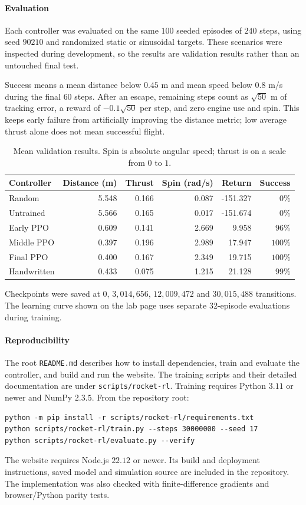 \documentclass[12pt, letterpaper]{article}
\begin{document}
\paragraph{Evaluation}
Each controller was evaluated on the same $100$ seeded episodes
of $240$ steps, using seed $90210$ and randomized static or
sinusoidal targets. These scenarios were inspected during
development, so the results are validation results rather than
an untouched final test.

Success means a mean distance below $0.45$ m and mean speed below
$0.8$ m/s during the final $60$ steps. After an escape, remaining
steps count as $\sqrt{50}$ m of tracking error, a reward of
$-0.1\sqrt{50}$ per step, and zero engine use and spin.
This keeps early failure from artificially improving the distance
metric; low average thrust alone does not mean successful flight.

\begin{table}[htbp]
\centering
\small
\setlength{\tabcolsep}{5pt}
\begin{tabular}{lrrrrr}
\hline
Controller & Distance (m) & Thrust & Spin (rad/s) & Return & Success\\
\hline
Random      & 5.548 & 0.166 & 0.087 & -151.327 & $0\%$\\
Untrained   & 5.566 & 0.165 & 0.017 & -151.674 & $0\%$\\
Early PPO   & 0.609 & 0.141 & 2.669 & 9.958    & $96\%$\\
Middle PPO  & 0.397 & 0.196 & 2.989 & 17.947   & $100\%$\\
Final PPO   & 0.400 & 0.167 & 2.349 & 19.715   & $100\%$\\
Handwritten & 0.433 & 0.075 & 1.215 & 21.128   & $99\%$\\
\hline
\end{tabular}
\caption{Mean validation results. Spin is absolute angular speed;
thrust is on a scale from $0$ to $1$.}
\end{table}

Checkpoints were saved at $0$, $3,014,656$, $12,009,472$ and
$30,015,488$ transitions. The learning curve shown on the lab page
uses separate $32$-episode evaluations during training.

\paragraph{Reproducibility}
The root \texttt{README.md} describes how to install dependencies,
train and evaluate the controller, and build and run the website.
The training scripts and their detailed documentation are under
\texttt{scripts/rocket-rl}. Training requires Python $3.11$ or newer
and NumPy $2.3.5$. From the repository root:
\begin{verbatim}
python -m pip install -r scripts/rocket-rl/requirements.txt
python scripts/rocket-rl/train.py --steps 30000000 --seed 17
python scripts/rocket-rl/evaluate.py --verify
\end{verbatim}
The website requires Node.js $22.12$ or newer. Its build and
deployment instructions, saved model and simulation source are
included in the repository. The implementation was also checked
with finite-difference gradients and browser/Python parity tests.
\end{document}
